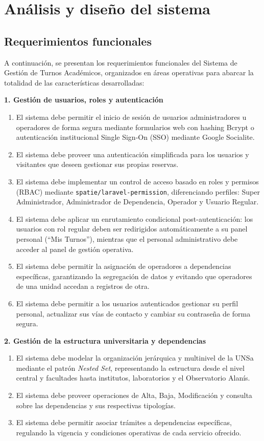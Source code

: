\chapter{Análisis y diseño del sistema}

\section{Requerimientos funcionales}
A continuación, se presentan los requerimientos funcionales del Sistema de Gestión de Turnos Académicos, organizados en áreas operativas para abarcar la totalidad de las características desarrolladas:

\textbf{1. Gestión de usuarios, roles y autenticación}
\begin{enumerate}
    \item El sistema debe permitir el inicio de sesión de usuarios administradores u operadores de forma segura mediante formularios web con hashing Bcrypt o autenticación institucional Single Sign-On (SSO) mediante Google Socialite.
    \item El sistema debe proveer una autenticación simplificada para los usuarios y visitantes que deseen gestionar sus propias reservas.
    \item El sistema debe implementar un control de acceso basado en roles y permisos (RBAC) mediante \texttt{spatie/laravel-permission}, diferenciando perfiles: Super Administrador, Administrador de Dependencia, Operador y Usuario Regular.
    \item El sistema debe aplicar un enrutamiento condicional post-autenticación: los usuarios con rol regular deben ser redirigidos automáticamente a su panel personal (``Mis Turnos''), mientras que el personal administrativo debe acceder al panel de gestión operativa.
    \item El sistema debe permitir la asignación de operadores a dependencias específicas, garantizando la segregación de datos y evitando que operadores de una unidad accedan a registros de otra.
    \item El sistema debe permitir a los usuarios autenticados gestionar su perfil personal, actualizar sus vías de contacto y cambiar su contraseña de forma segura.
\end{enumerate}

\textbf{2. Gestión de la estructura universitaria y dependencias}
\begin{enumerate}[resume]
    \item El sistema debe modelar la organización jerárquica y multinivel de la UNSa mediante el patrón \textit{Nested Set}, representando la estructura desde el nivel central y facultades hasta institutos, laboratorios y el Observatorio Alanís.
    \item El sistema debe proveer operaciones de Alta, Baja, Modificación y consulta sobre las dependencias y sus respectivas tipologías.
    \item El sistema debe permitir asociar trámites a dependencias específicas, regulando la vigencia y condiciones operativas de cada servicio ofrecido.
\end{enumerate}

